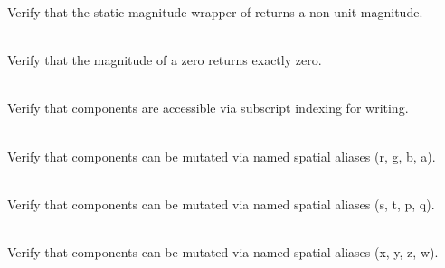 \begin{DoxyRefList}
%
Verify that the static magnitude wrapper of  returns a non-\/unit magnitude.  
\item[{\parbox[t]{\linewidth}{Member \doxylink{_magnitude_tests_8cpp_a8a099e8beb853a0a450ab830bbb338ce}{Vector4\+DMagnitude\+\_\+\+Zero\+Vector\+Returns\+Zero} ()}}]\hfill \\
\label{test__test000108}%
%
Verify that the magnitude of a zero  returns exactly zero.  
\item[{\parbox[t]{\linewidth}{Member \doxylink{group___f_g_m___vec4___mutation_ga0d0bf8d13ce647da62bdda46aa95ed96}{Vector4\+DMutation\+\_\+\+Elements\+Can\+Be\+Mutated\+Using\+Index} ()}}]\hfill \\
\label{test__test000009}%
%
Verify that  components are accessible via subscript indexing for writing.  
\item[{\parbox[t]{\linewidth}{Member \doxylink{group___f_g_m___vec4___mutation_ga5393bc3973ccca0a991374144b92ffb0}{Vector4\+DMutation\+\_\+\+Elements\+Can\+Be\+Mutated\+Using\+RGBA} ()}}]\hfill \\
\label{test__test000008}%
%
Verify that  components can be mutated via named spatial aliases (r, g, b, a).  
\item[{\parbox[t]{\linewidth}{Member \doxylink{group___f_g_m___vec4___mutation_gaab414c5736d189c56f3d2a75f0bc992a}{Vector4\+DMutation\+\_\+\+Elements\+Can\+Be\+Mutated\+Using\+STPQ} ()}}]\hfill \\
\label{test__test000007}%
%
Verify that  components can be mutated via named spatial aliases (s, t, p, q).  
\item[{\parbox[t]{\linewidth}{Member \doxylink{group___f_g_m___vec4___mutation_ga19dec249204a949eae9b91080cb21d24}{Vector4\+DMutation\+\_\+\+Elements\+Can\+Be\+Mutated\+Using\+XYZW} ()}}]\hfill \\
\label{test__test000006}%
%
Verify that  components can be mutated via named spatial aliases (x, y, z, w).  
\item[{\parbox[t]{\linewidth}{Member \doxylink{_magnitude_tests_8cpp_a7dd3baea55662b88b6ed3e1dec941b0e}{Vector4\+DNormalization\+\_\+\+Non\+Zero\+Vector\+Normalization\+Returns\+Unit\+Vector} ()}}]\hfill \\

\end{DoxyRefList}
